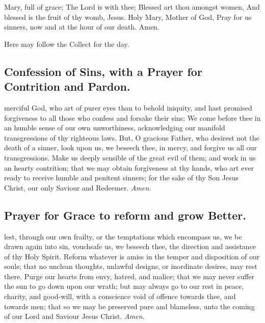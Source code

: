  Mary, full of grace; The Lord is with thee; Blessed art thou amongst women, And blessed is the fruit of thy womb, Jesus. Holy Mary, Mother of God, Pray for us sinners, now and at the hour of our death. Amen.
\begin{rubric}
    Here may follow the Collect for the day.
\end{rubric}
\subsection{Confession of Sins, with a Prayer for Contrition and Pardon.}
 merciful God, who art of purer eyes than to behold iniquity, and hast promised forgiveness to all those who confess and forsake their sins; We come before thee in an humble sense of our own unworthiness, acknowledging our manifold transgressions of thy righteous laws. But, O gracious Father, who desirest not the death of a sinner, look upon us, we beseech thee, in mercy, and forgive us all our transgressions. Make us deeply sensible of the great evil of them; and work in us an hearty contrition; that we may obtain forgiveness at thy hands, who art ever ready to receive humble and penitent sinners; for the sake of thy Son Jesus Christ, our only Saviour and Redeemer. \textit{Amen.}
\subsection{Prayer for Grace to reform and grow Better.}
 lest, through our own frailty, or the temptations which encompass us, we be drawn again into sin, vouchsafe us, we beseech thee, the direction and assistance of thy Holy Spirit. Reform whatever is amiss in the temper and disposition of our souls; that no unclean thoughts, unlawful designs, or inordinate desires, may rest there. Purge our hearts from envy, hatred, and malice; that we may never suffer the sun to go down upon our wrath; but may always go to our rest in peace, charity, and good-will, with a conscience void of offence towards thee, and towards men; that so we may be preserved pure and blameless, unto the coming of our Lord and Saviour Jesus Christ. \textit{Amen.}
